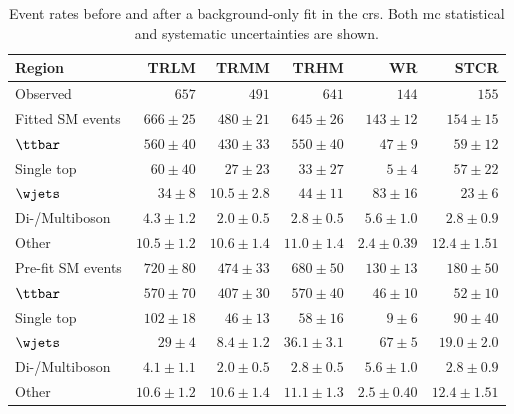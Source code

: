 \begin{table}
\begin{center}
{\small
\begin{tabular}{lrrrrr}
\toprule
Region           & TRLM            & TRMM            & TRHM            & WR            & STCR              \\[-0.05cm]
\midrule
Observed          & $657$              & $491$              & $641$              & $144$              & $155$                    \\
\midrule
Fitted SM events       & $666 \pm 25$          & $480 \pm 21$          & $645 \pm 26$          & $143 \pm 12$          & $154 \pm 15$              \\
\midrule
       $\ttbar$         & $560 \pm 40$          & $430 \pm 33$          & $550 \pm 40$          & $47 \pm 9$          & $59 \pm 12$              \\
       Single top         & $60 \pm 40$          & $27 \pm 23$          & $33 \pm 27$          & $5 \pm 4$          & $57 \pm 22$              \\
       $\wjets$         & $34 \pm 8$          & $10.5 \pm 2.8$          & $44 \pm 11$          & $83 \pm 16$          & $23 \pm 6$              \\
       Di-/Multiboson         & $4.3 \pm 1.2$          & $2.0 \pm 0.5$          & $2.8 \pm 0.5$          & $5.6 \pm 1.0$          & $2.8 \pm 0.9$              \\
       Other        & $10.5 \pm 1.2$          & $10.6 \pm 1.4$          & $11.0 \pm 1.4$          & $2.4 \pm 0.39$          & $12.4 \pm 1.51$              \\
\toprule
Pre-fit SM events              & $720 \pm 80$          & $474 \pm 33$          & $680 \pm 50$          & $130 \pm 13$          & $180 \pm 50$              \\
\midrule
        $\ttbar$         & $570 \pm 70$          & $407 \pm 30$          & $570 \pm 40$          & $46 \pm 10$          & $52 \pm 10$              \\
        Single top         & $102 \pm 18$          & $46 \pm 13$          & $58 \pm 16$          & $9 \pm 6$          & $90 \pm 40$              \\
        $\wjets$        & $29 \pm 4$          & $8.4 \pm 1.2$          & $36.1 \pm 3.1$          & $67 \pm 5$          & $19.0 \pm 2.0$              \\
        Di-/Multiboson         & $4.1 \pm 1.1$          & $2.0 \pm 0.5$          & $2.8 \pm 0.5$          & $5.6 \pm 1.0$          & $2.8 \pm 0.9$              \\
        Other         & $10.6 \pm 1.2$          & $10.6 \pm 1.4$          & $11.1 \pm 1.3$          & $2.5 \pm 0.40$          & $12.4 \pm 1.51$              \\
\bottomrule
\end{tabular}}
\end{center}
\caption{Event rates before and after a background-only fit in the \glspl{cr}. Both \gls{mc} statistical and systematic uncertainties are shown.}
\label{tab:results_bkg_only_CR}
\end{table}
%